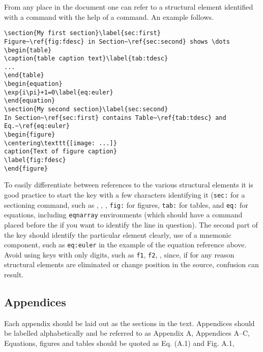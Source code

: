 \documentclass{cernrep}
\begin{document}
From any place in the document one can refer to a structural element
identified with a  command with the help of a 
command. An example follows.

\begin{verbatim}
\section{My first section}\label{sec:first}
Figure~\ref{fig:fdesc} in Section~\ref{sec:second} shows \dots
\begin{table}
\caption{table caption text}\label{tab:tdesc}
...
\end{table}
\begin{equation}
\exp{i\pi}+1=0\label{eq:euler}
\end{equation}
\section{My second section}\label{sec:second}
In Section~\ref{sec:first} contains Table~\ref{tab:tdesc} and
Eq.~\ref{eq:euler}
\begin{figure}
\centering\texttt{[image: ...]}
caption{Text of figure caption}
\label{fig:fdesc}
\end{figure}
\end{verbatim}
To easily differentiate between references to the various structural
elements it is good practice to start the key with a few characters
identifying it (\eg \texttt{sec:} for a sectioning command, such as
, , \etc, \texttt{fig:} for figures,
\texttt{tab:} for tables, and \texttt{eq:} for equations, including
\texttt{eqnarray} environments (which should have a 
command placed before the \Lcs{\bs} if you want to identify the line
in question). The second part of the key should identify the
particular element clearly, \eg use of a mnemonic component, such as
\texttt{eq:euler} in the example of the equation reference
above. Avoid using keys with only digits, such as \texttt{f1},
\texttt{f2}, \etc, since, if for any reason structural elements are
eliminated or change position in the source, confusion can result.

\subsection{Appendices}

Each appendix should be laid out as the sections in the text.
Appendices should be labelled alphabetically and be referred to as
Appendix A, Appendices A--C, \etc Equations, figures and tables should
be quoted as Eq. (A.1) and Fig. A.1, \etc
\end{document}
